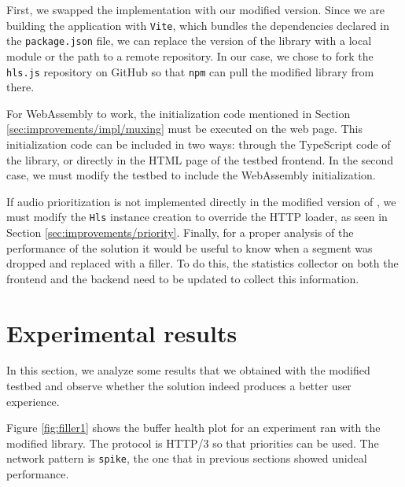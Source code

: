 First, we swapped the \hlsjs{} implementation with our modified version. Since we are building the application with \texttt{Vite}, which bundles the dependencies declared in the \texttt{package.json} file, we can replace the version of the \hlsjs{} library with a local module or the path to a remote repository. In our case, we chose to fork the \texttt{hls.js} repository on GitHub so that \texttt{npm} can pull the modified library from there.

For WebAssembly to work, the initialization code mentioned in Section \ref{sec:improvements/impl/muxing} must be executed on the web page. This initialization code can be included in two ways: through the TypeScript code of the \hlsjs{} library, or directly in the HTML page of the testbed frontend. In the second case, we must modify the testbed to include the WebAssembly initialization.

If audio prioritization is not implemented directly in the modified version of \hlsjs{}, we must modify the \texttt{Hls} instance creation to override the HTTP loader, as seen in Section \ref{sec:improvements/priority}. Finally, for a proper analysis of the performance of the solution it would be useful to know when a segment was dropped and replaced with a filler. To do this, the statistics collector on both the frontend and the backend need to be updated to collect this information.

\section{Experimental results}
\label{sec:improvements/results}

In this section, we analyze some results that we obtained with the modified testbed and observe whether the solution indeed produces a better user experience.

Figure \ref{fig:filler1} shows the buffer health plot for an experiment ran with the modified \hlsjs{} library. The protocol is HTTP/3 so that priorities can be used. The network pattern is \texttt{spike}, the one that in previous sections showed unideal performance.

